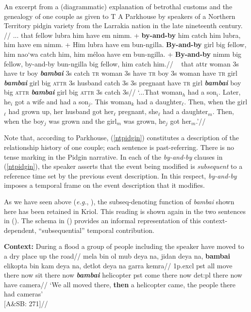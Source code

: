 \ex\label{ntpidgin}\begingl\glpreamble \textup{An excerpt from a (diagrammatic) explanation of betrothal customs and the genealogy of one couple as given to T A Parkhouse by speakers of a Northern Territory pidgin variety from the Larrakia nation in the late nineteenth century. }\vspace{.3em}//
	\gla ... that fellow lubra him have em nimm. +	\textbf{by-and-by} him catch him lubra, him have em nimm. +	Him lubra have em bun-ngilla.
	\textbf{By-and-by} girl big fellow, him nao`wa catch him, him méloa have em bun-ngilla. +	\textbf{By-and-by} nimm big fellow, by-and-by bun-ngilla big fellow, him catch him.//
	\glb ~ that {\sc attr} woman 3s have {\sc tr} boy
	\textit{\textbf{bambai}} 3s catch \textsc{tr} woman 3s have \textsc{tr} boy 3s woman have \textsc{tr} girl \textit{\textbf{bambai}} girl big \textsc{attr} 3s husband catch 3s 3s pregnant have \textsc{tr} girl \textit{\textbf{bambai}} boy big \textsc{attr} \textit{\textbf{bambai}} girl big \textsc{attr} 3s catch 3s//
	\glft `...That woman$_h$ had a son$_i$. Later, he$_i$ got a wife and had a son$_j$. This woman$_k$ had a daughter$_\ell$. Then, when the girl$_\ell$ had grown up, her husband got her$_\ell$ pregnant, she$_\ell$ had a daughter$_m$. Then, when the boy$_j$ was grown and the girl$_m$ was grown, he$_j$ got her$_m$.'//\endgl
\xe

Note that, according to Parkhouse, (\ref{ntpidgin}) constitutes a description of the relationship history of one couple; each sentence is past-referring. There is no tense marking in the Pidgin narrative.  In each of the \textit{by-and-by} clauses in (\ref{ntpidgin}), the speaker asserts that the event being modified is \textit{subsequent} to a reference time set by the previous event description. In this respect, \textit{by-and-by} imposes a temporal frame on the event description that it modifies. 

As we have seen above (\textit{e.g.}, ), the {\sc subseq}-denoting function of \textit{bambai} shown here has been retained in Kriol. This reading is shown again in the two sentences in (). The schema in () provides an informal representation of this context-dependent, ``subsequential'' temporal contribution.

\pex\a{}	\begingl	\glpreamble \textbf{Context:} During a flood a group of people including the speaker have moved to a dry place up the road//
	\gla mela bin ol mub deya na, jidan deya na, \textbf{bambai} elikopta bin kam deya na, detlot deya na garra kemra//
	\glb 1p{\sc.excl} {\sc pst} all move there now sit there now \textbf{\textit{bambai}} helicopter {\sc pst} come there now {\sc det:pl} there now have camera//
	\glft `We all moved there, \textbf{then} a helicopter came, the people there had cameras'\\\hspace*{\fill}[A\&SB: 271]//
	\endgl

